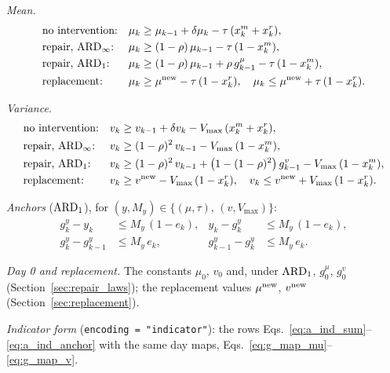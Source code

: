 \emph{Mean.}
\begin{align}
  &\text{no intervention:} & \mu_k &\geq \mu_{k-1} + \delta\mu_k - \tau\,(x^m_k + x^r_k),
    \label{eq:g_mu_carry} \\
  &\text{repair, } \mathrm{ARD}_{\infty}\text{:} & \mu_k &\geq (1-\rho)\,\mu_{k-1} - \tau\,(1 - x^m_k),
    \label{eq:g_mu_inf} \\
  &\text{repair, } \mathrm{ARD}_{1}\text{:} & \mu_k &\geq (1-\rho)\,\mu_{k-1} + \rho\, g^{\mu}_{k-1}
    - \tau\,(1 - x^m_k),
    \label{eq:g_mu_one} \\
  &\text{replacement:} & \mu_k &\geq \mu^{\mathrm{new}} - \tau\,(1 - x^r_k), \quad
    \mu_k \leq \mu^{\mathrm{new}} + \tau\,(1 - x^r_k).
    \label{eq:g_mu_repl}
\end{align}

\emph{Variance.}
\begin{align}
  &\text{no intervention:} & v_k &\geq v_{k-1} + \delta v_k - V_{\max}\,(x^m_k + x^r_k),
    \label{eq:g_v_carry} \\
  &\text{repair, } \mathrm{ARD}_{\infty}\text{:} & v_k &\geq (1-\rho)^2\, v_{k-1}
    - V_{\max}\,(1 - x^m_k),
    \label{eq:g_v_inf} \\
  &\text{repair, } \mathrm{ARD}_{1}\text{:} & v_k &\geq (1-\rho)^2\, v_{k-1}
    + \bigl(1 - (1-\rho)^2\bigr)\, g^{v}_{k-1} - V_{\max}\,(1 - x^m_k),
    \label{eq:g_v_one} \\
  &\text{replacement:} & v_k &\geq v^{\mathrm{new}} - V_{\max}\,(1 - x^r_k), \quad
    v_k \leq v^{\mathrm{new}} + V_{\max}\,(1 - x^r_k).
    \label{eq:g_v_repl}
\end{align}

\emph{Anchors} ($\mathrm{ARD}_{1}$), for $(y, M_y) \in \{(\mu, \tau),\, (v, V_{\max})\}$:
\begin{align}
  g^{y}_k - y_k &\leq M_y\,(1 - e_k), & y_k - g^{y}_k &\leq M_y\,(1 - e_k),
    \label{eq:g_anchor_set} \\
  g^{y}_k - g^{y}_{k-1} &\leq M_y\, e_k, & g^{y}_{k-1} - g^{y}_k &\leq M_y\, e_k.
    \label{eq:g_anchor_keep}
\end{align}

\emph{Day 0 and replacement.} The constants $\mu_0$, $v_0$ and, under $\mathrm{ARD}_{1}$,
$g^{\mu}_0$, $g^{v}_0$ (Section~\ref{sec:repair_laws}); the replacement values
$\mu^{\mathrm{new}}$, $v^{\mathrm{new}}$ (Section~\ref{sec:replacement}).

\emph{Indicator form} (\texttt{encoding = "indicator"}): the rows
Eqs.~\eqref{eq:a_ind_sum}--\eqref{eq:a_ind_anchor} with the same day maps,
Eqs.~\eqref{eq:g_map_mu}--\eqref{eq:g_map_v}.

